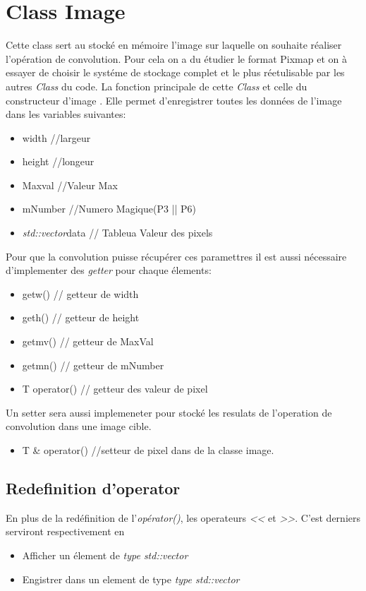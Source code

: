 \section{Class Image}
Cette class sert au stocké en mémoire l'image sur laquelle on souhaite réaliser l'opération de convolution.
Pour cela on a du étudier le format Pixmap et on à essayer de  choisir  le systéme de stockage complet et le 
plus réetulisable par les autres {\it Class} du code.
La fonction principale de cette {\it Class} et celle du constructeur d'image . Elle permet d'enregistrer toutes 
les données de l'image dans les variables suivantes:
\begin{itemize}
	\item width   			//largeur
	\item height 			//longeur
	\item Maxval  			//Valeur Max 	
	\item mNumber 			//Numero Magique(P3 || P6)
	\item {\it std::vector}data 	// Tableua Valeur des pixels 
\end{itemize}
Pour que la convolution puisse r\'ecupérer ces paramettres il est aussi nécessaire d'implementer des {\it getter} pour 
chaque \'elements:
\begin{itemize}
\item getw()	    // getteur de width	
\item geth()	    // getteur de height	
\item getmv()	    // getteur de MaxVal	
\item getmn()	    // getteur de mNumber	
\item T operator() // getteur des valeur de pixel
\end{itemize}
Un setter sera aussi implemeneter pour stocké les resulats de l'operation de convolution dans une image cible.
\begin{itemize}
\item T \& operator() //setteur de pixel dans de la classe image.
\end{itemize}
\subsection{Redefinition d'operator}
En plus de la redéfinition de l'{\it op\'erator()}, les operateurs {\it <<}  et {\it >>}.
C'est derniers serviront respectivement en
\begin{itemize}
\item Afficher un élement de {\it type std::vector}
\item Engistrer dans un element de type {\it type std::vector}
\end{itemize}  

